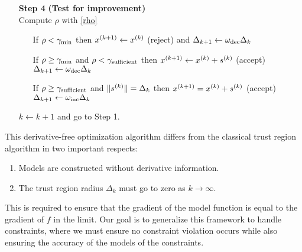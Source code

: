 \begin{algorithm}[H]
\begin{itemize}
        \item[\textbf{Step 4}] \textbf{(Test for improvement)} \\
            Compute $\rho$ with \cref{rho} \begin{itemize}
                \item[] If $\rho < \gamma_{\text{min}}$ then ${{x}^{(k+1)}} \gets {x^{(k)}}$ (reject) and $\Delta_{k+1} \gets \omega_{\text{dec}}\Delta_{k}$
                \item[] If $\rho \ge \gamma_{\text{min}}$ and $\rho < \gamma_{\text{sufficient}}$ then ${{x}^{(k+1)}}\gets{x^{(k)}}+{{s}^{(k)}}$ (accept) $\Delta_{k+1} \gets \omega_{\text{dec}}\Delta_{k}$
                \item[] If $\rho \ge \gamma_{\text{sufficient}}$ and $\|{{s}^{(k)}}\| = \Delta_{k}$ then ${{x}^{(k+1)}}={x^{(k)}}+{{s}^{(k)}}$ (accept) $\Delta_{k+1} \gets \omega_{\text{inc}}\Delta_{k}$
            \end{itemize}
            $k \gets k+1$ and go to Step 1.
    \end{itemize}
\end{algorithm}

This derivative-free optimization algorithm differs from the classical trust region algorithm in two important respects:
\begin{enumerate}
    \item Models are constructed without derivative information.
    \item The trust region radius $\Delta_k$ must go to zero as $k\to\infty$.
\end{enumerate}

This is required to ensure that the gradient of the model function is equal to the gradient of $f$ in the limit.
Our goal is to generalize this framework to handle constraints, where we must ensure no constraint violation occurs while also ensuring the accuracy of the models of the constraints.
% 
%   
  

